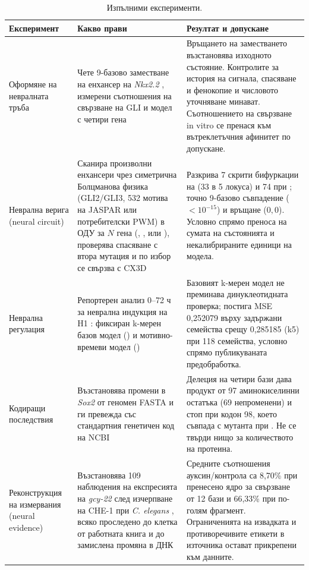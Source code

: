 \documentclass[10.5pt,a4paper]{article}
\begin{document}
\begin{table}[tb]
\small
\caption{Изпълними експерименти.}\label{tab:experiments}
\begin{tabular}{@{}L{25mm}L{56mm}L{67mm}@{}}
\toprule
Експеримент & Какво прави & Резултат и допускане \\
\midrule
Оформяне на невралната тръба & Чете 9-базово заместване на енхансер на \emph{Nkx2.2} \citep{peterson2012}, измерени съотношения на свързване на GLI \citep{hallikas2006} и модел с четири гена \citep{herreradelgado2020,cohen2014} & Връщането на заместването възстановява изходното състояние. Контролите за история на сигнала, спасяване и фенокопие и числовото уточняване минават. Съотношението на свързване in vitro се пренася към вътреклетъчния афинитет по допускане. \\
Неврална верига (neural circuit) & Сканира произволни енхансери чрез симетрична Болцманова физика (GLI2/GLI3, 532 мотива на JASPAR или потребителски PWM) в ОДУ за $N$ гена (, ,  или ), проверява спасяване с втора мутация и по избор се свързва с CX3D & Разкрива 7 скрити бифуркации на  (33 в 5 локуса) и 74 при ; точно 9-базово съвпадение ($<10^{-15}$) и връщане ($0{,}0$). Условно спрямо преноса на сумата на състоянията и некалибрираните единици на модела. \\
Неврална регулация & Репортерен анализ 0–72 ч за неврална индукция на H1 \citep{kreimer2022}: фиксиран k-мерен базов модел () и мотивно-времеви модел () & Базовият k-мерен модел не преминава динуклеотидната проверка;  постига MSE 0,252079 върху задържани семейства срещу 0,285185 (k5) при 118 семейства, условно спрямо публикуваната предобработка. \\
Кодиращи последствия & Възстановява промени в \emph{Sox2} от геномен FASTA и ги превежда със стандартния генетичен код на NCBI & Делеция на четири бази дава продукт от 97 аминокиселинни остатъка (69 непроменени) и стоп при кодон 98, което съвпада с мутанта при \citet{gong2020}. Не се твърди нищо за количеството на протеина. \\
Реконструкция на измервания (neural evidence) & Възстановява 109 наблюдения на експресията на \emph{gcy-22} след изчерпване на CHE-1 при \emph{C. elegans} \citep{traets2021}, всяко проследено до клетка от работната книга и до замислена промяна в ДНК & Средните съотношения ауксин/контрола са 8,70\% при пренесено ядро за свързване от 12 бази и 66,33\% при по-голям фрагмент. Ограниченията на извадката и противоречивите етикети в източника остават прикрепени към данните. \\

\end{tabular}
\end{table}
\end{document}
